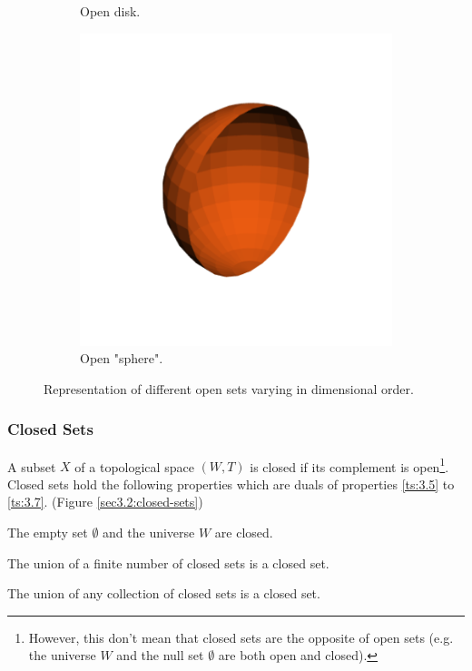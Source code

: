 \documentclass[a4paper,11pt,oneside]{article}
\begin{document}
\begin{figure}[ht]
\begin{subfigure}[b]{0.2\textwidth}
		\caption{Open disk.}
	\end{subfigure}
	\hfill
	\begin{subfigure}[b]{0.2\textwidth}
		\centering
		\includegraphics[width=\textwidth]{section3/3.2/open-sphere.png}
		\caption{Open "sphere".}
	\end{subfigure}
	\hfill
	\caption{Representation of different open sets varying in dimensional order.}
	\label{sec3.2:open-sets}
\end{figure}

   
    
\subsubsection{Closed Sets}
\begin{definition}
	A subset $X$ of a topological space $(W, T)$ is closed if its complement is open\footnote{However, this don't mean that closed sets are the opposite of open sets (e.g. the universe $W$ and the null set $\emptyset$ are both open and closed)\cite{mansfield_1987}.}. Closed sets hold the following properties which are duals of properties \eqref{ts:3.5} to \eqref{ts:3.7}. (Figure \ref{sec3.2:closed-sets})
			    
	\begin{property}
		The empty set $\emptyset$ and the universe $W$ are closed. \cite{mansfield_1987}
	\end{property}
	\begin{property}
		The union of a finite number of closed sets is a closed set. \cite{mansfield_1987}
	\end{property}
	\begin{property}
		The union of any collection of closed sets is a closed set. \cite{mansfield_1987}
	\end{property}
\end{definition}
    
\end{document}
